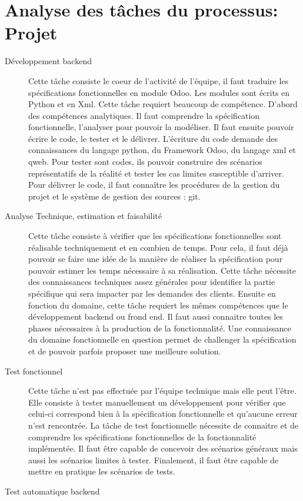 \section{Analyse des tâches du processus: Projet}
\begin{description}
    \item[Développement backend]
    Cette tâche consiste le coeur de l'activité de l'équipe, il faut traduire les spécifications fonctionnelles en module Odoo. Les modules sont écrits en Python et en Xml. Cette tâche requiert beaucoup de compétence. D'abord des compétences analytiques. Il faut comprendre la spécification fonctionnelle, l'analyser pour pouvoir la modéliser. Il faut ensuite pouvoir écrire le code, le tester et le délivrer. L'écriture du code demande des connaissances du langage python, du Framework Odoo, du langage xml et qweb. Pour tester sont codes, ils pouvoir construire des scénarios représentatifs de la réalité et tester les cas limites susceptible d'arriver. Pour délivrer le code, il faut connaître les procédures de la gestion du projet et le système de gestion des sources : git. 
    \item[Analyse Technique, estimation et faisabilité]
    Cette tâche consiste à vérifier que les spécifications fonctionnelles sont réalisable techniquement et en combien de temps. Pour cela, il faut déjà pouvoir se faire une idée de la manière de réaliser la spécification pour pouvoir estimer les temps nécessaire à sa réalisation. Cette tâche nécessite des connaissances techniques assez générales pour identifier la partie spécifique qui sera impacter par les demandes des clients. Ensuite en fonction du domaine, cette tâche requiert les mêmes compétences que le développement backend ou frond end. Il faut aussi connaitre toutes les phases nécessaires à la production de la fonctionnalité. Une connaissance du domaine fonctionnelle en question permet de challenger la spécification et de pouvoir parfois proposer une meilleure solution. 
    \item[Test fonctionnel]
    Cette tâche n'est pas effectuée par l'équipe technique mais elle peut l'être. Elle consiste à tester manuellement un développement pour vérifier que celui-ci correspond bien à la spécification fonctionnelle et qu'aucune erreur n'est rencontrée. La tâche de test fonctionnelle nécessite de connaitre et de comprendre les spécifications fonctionnelles de la fonctionnalité implémentée. Il faut être capable de concevoir des scénarios généraux mais aussi les scénarios limites à tester. Finalement, il faut être capable de mettre en pratique les scénarios de tests. 
    \item[Test automatique backend]
    

\end{description}
